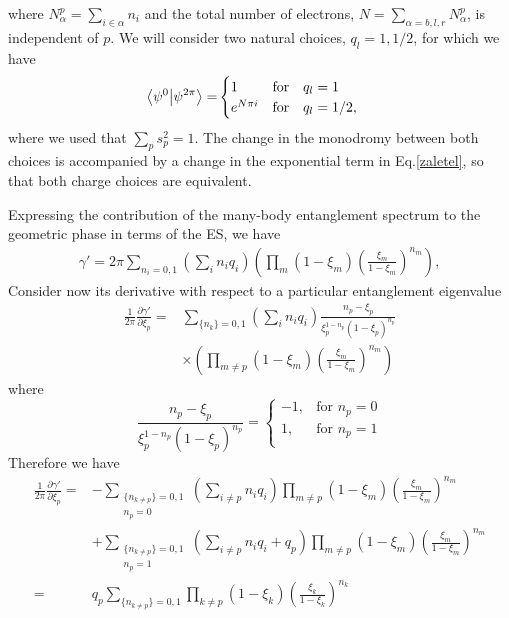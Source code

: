 \documentclass[twocolumn,amsmath,longbibliography,amssymb,superscriptaddress]{revtex4-1}
\begin{document}
where $N^p_\alpha = \sum_{i \in \alpha} n_i$ and the total number of electrons, $N = \sum_{\alpha = b,l,r} N^p_\alpha$, is independent of $p$. We will consider two natural choices, $q_l = 1,1/2$, for which we have
\begin{align}
\bra{\psi^0}\ket{\psi^{2\pi}} =& 
\begin{cases}
1 & \text{for} \quad q_l = 1 \\
e^{N\pi i} & \text{for} \quad q_l = 1/2,
\end{cases}
\end{align}
where we used that $\sum_p s_p^2 = 1$. The change in the monodromy between both choices is accompanied by a change in the exponential term in Eq.\ref{zaletel}, so that both charge choices are equivalent.

Expressing the contribution of the many-body entanglement spectrum to the geometric phase in terms of the ES, we have
\begin{align*}
\gamma' = 2\pi \sum_{n_i = 0,1} \left(\sum_{i } n_i q_i\right) \left(\prod_m (1- \xi_m)\left(\frac{\xi_m}{1-\xi_m} \right)^{n_m} \right) ,
\end{align*} 
Consider now its derivative with respect to a particular entanglement eigenvalue
\begin{align}
\frac{1}{2\pi}\frac{\partial \gamma'}{\partial \xi_p} =& \sum_{\{n_k\}=0,1}\left(\sum_{i } n_i q_i\right)\frac{n_p - \xi_p}{\xi_p^{1-n_p}(1-\xi_p)^{n_p}}\\
&\times \left(\prod_{m\neq p} (1- \xi_m)\left(\frac{\xi_m}{1-\xi_m} \right)^{n_m} \right)
\end{align}
where
\begin{equation}
 \frac{n_p - \xi_p}{\xi_p^{1-n_p}(1-\xi_p)^{n_p}} = 
  \begin{cases}
    -1, & \text{for } n_p=0 \\
    1, & \text{for } n_p = 1 \\
  \end{cases}	
\end{equation}
Therefore we have
\begin{align*}
\frac{1}{2\pi}\frac{\partial \gamma'}{\partial \xi_p} =& -\sum_{\substack{\{n_{k\neq p}\}=0,1 \\ n_p = 0}}\left(\sum_{i \neq p} n_i q_i\right)\prod_{m\neq p} (1-\xi_m)\left( \frac{\xi_m}{1-\xi_m} \right)^{n_m} \\
&+ \sum_{\substack{\{n_{k\neq p}\}=0,1 \\ n_p = 1}}\left(\sum_{i \neq p} n_i q_i +q_p\right) \prod_{m\neq p} (1-\xi_m)\left( \frac{\xi_m}{1-\xi_m} \right)^{n_m} \\
=&q_p\sum_{\{n_{k\neq p}\}=0,1} \prod_{k\neq p} (1-\xi_k)\left( \frac{\xi_k}{1-\xi_k} \right)^{n_k} \\
\end{align*}
\end{document}
